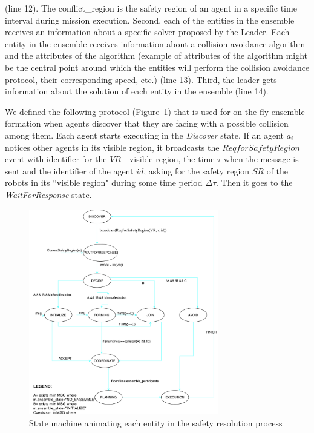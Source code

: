 \documentclass[journal]{IEEEtran}
\theoremstyle{definition}
\newcommand\patrizio[1]{\nb{Patrizio}{#1}}
\begin{document}
(line 12). The conflict\_region is the safety region of an agent in a specific time interval during mission execution. Second, each of the entities in the  ensemble receives an information about a specific solver proposed by the Leader. Each entity in the ensemble receives information about a collision avoidance algorithm and the attributes of the algorithm (example of attributes of the algorithm might be the central point around which the entities will perform the collision avoidance protocol,  their corresponding speed, etc.) (line 13).
Third, the leader gets information about the solution  of each entity in the ensemble (line 14).


We defined the following protocol (Figure~\ref{fig:STMachine}) that is used for on-the-fly ensemble formation when agents discover that they are facing with a possible collision among them. Each agent starts executing in the \textit{Discover} state. 
If an agent $a_i$ notices other agents in its visible region, it broadcasts the $ReqforSafetyRegion$ event with identifier for the $VR$ - visible  region, the time $\tau$ when the message is sent and the identifier of the agent $id$, asking for the safety region $SR$ of the robots in its ``visible region" during some time period $\Delta\tau$. Then it goes to the \textit{WaitForResponse} state.

\begin{figure}[h]
\includegraphics[width=3.25in]{Figures/SafetyResolution_FFFF.pdf}
\caption{State machine animating each entity in the safety resolution process}\label{fig:STMachine}
\end{figure}
\end{document}
